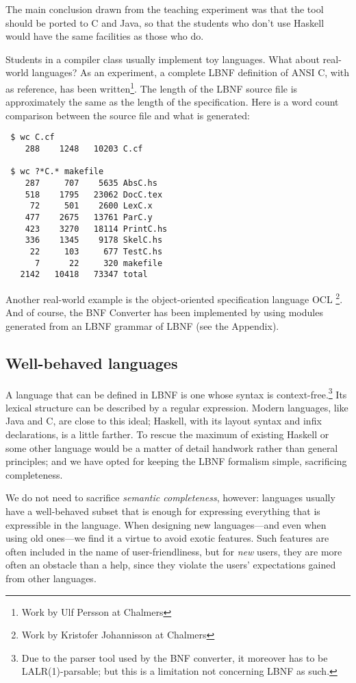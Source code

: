 \documentclass[10pt]{article}
\begin{document}
The main conclusion drawn from the teaching experiment was that the tool should
be ported to C and Java, so that the students who don't use Haskell
would have the same facilities as those who do.

Students in a compiler class usually implement toy languages.
What about real-world languages?
As an experiment, a complete LBNF definition of
ANSI C, with \cite{Kern88} as reference, has been
written\footnote{Work by Ulf Persson at Chalmers}. The length of the
LBNF source file is approximately the same as the length of the specification.
Here is a word count comparison between the source file and what is generated:
\begin{verbatim}
 $ wc C.cf
    288    1248   10203 C.cf

 $ wc ?*C.* makefile
    287     707    5635 AbsC.hs
    518    1795   23062 DocC.tex
     72     501    2600 LexC.x
    477    2675   13761 ParC.y
    423    3270   18114 PrintC.hs
    336    1345    9178 SkelC.hs
     22     103     677 TestC.hs
      7      22     320 makefile
   2142   10418   73347 total
\end{verbatim}
Another real-world
example is the
object-oriented specification language OCL \cite{WarmerKleppe99}\footnote{
Work by Kristofer Johannisson at Chalmers}.
And of course, the BNF Converter has been
implemented by using modules generated from
an LBNF grammar of LBNF (see the Appendix).


\subsection{Well-behaved languages}

A language that can be defined in LBNF
is one whose syntax is context-free.\footnote{
Due to the parser tool used by the BNF converter, it
moreover has to be LALR(1)-parsable; but this is
a limitation not concerning LBNF as such.}
Its lexical structure can be described by
a regular expression.
Modern languages, like Java and C, are close to this ideal;
Haskell, with its layout syntax and infix declarations, is
a little farther.
To rescue the maximum of existing Haskell or some other language
would be a matter
of detail handwork rather than general principles; and we have opted
for keeping the LBNF formalism simple, sacrificing completeness.

We do not need to sacrifice {\em semantic completeness}, however:
languages usually have a well-behaved subset that is enough for
expressing everything that is expressible in the language.
When designing new languages---and even when using old
ones---we find it a virtue to avoid exotic features.
Such features are often included in the name of user-friendliness,
but for {\em new} users, they are more often an obstacle than
a help, since they violate the users' expectations gained from
other languages.
\end{document}
